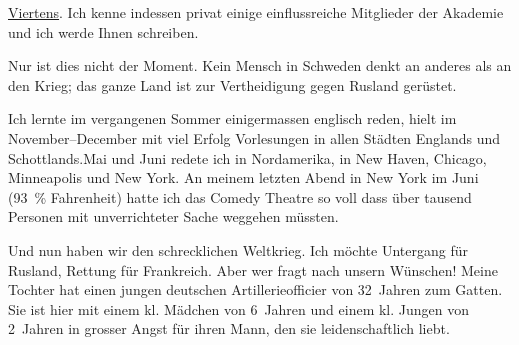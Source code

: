 \pstart
           \uline{Viertens}. Ich kenne indessen privat einige
               einflussreiche Mitglieder der Akademie und ich werde Ihnen schreiben.\pend
           
\pstart
           Nur ist dies nicht der Moment. Kein Mensch in Schweden denkt an anderes als an den Krieg; das ganze Land ist zur
               Vertheidigung gegen Rusland gerüstet.\pend
           
\pstart
           {\pb}Ich lernte im vergangenen Sommer
               einigermassen englisch reden, hielt im November–December
               mit viel Erfolg Vorlesungen in allen Städten Englands und Schottlands.\hspace*{2em}Mai und Juni redete ich in Nordamerika, in New Haven, Chicago, Minneapolis und New York. An meinem
               letzten Abend in New York im Juni
                  (93 {\%} Fahrenheit) hatte ich das Comedy Theatre so voll dass über tausend Personen mit
               unverrichteter Sache weggehen müssten.\pend
           
\pstart
           Und nun haben wir den schrecklichen Weltkrieg. Ich möchte Untergang für Rusland, Rettung für Frankreich. Aber wer fragt nach unsern Wünschen! Meine Tochter hat einen jungen
               deutschen Artillerieofficier
               von 32 Jahren zum Gatten. Sie ist hier mit einem kl. Mädchen von 6 Jahren und einem kl. Jungen von 2 Jahren in
               grosser Angst für ihren Mann,
               den sie leidenschaftlich liebt.\pend
           
